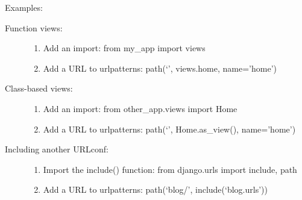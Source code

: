 \documentclass[letterpaper,10pt,openany,oneside,english]{sphinxmanual}
\begin{document}
Examples:
\begin{description}
\item[{Function views:}] \leavevmode\begin{enumerate}
\item {} 
Add an import:  from my\_app import views

\item {} 
Add a URL to urlpatterns:  path(‘’, views.home, name=’home’)

\end{enumerate}

\item[{Class-based views:}] \leavevmode\begin{enumerate}
\item {} 
Add an import:  from other\_app.views import Home

\item {} 
Add a URL to urlpatterns:  path(‘’, Home.as\_view(), name=’home’)

\end{enumerate}

\item[{Including another URLconf:}] \leavevmode\begin{enumerate}
\item {} 
Import the include() function: from django.urls import include, path

\item {} 
Add a URL to urlpatterns:  path(‘blog/’, include(‘blog.urls’))

\end{enumerate}

\end{description}
\end{document}

